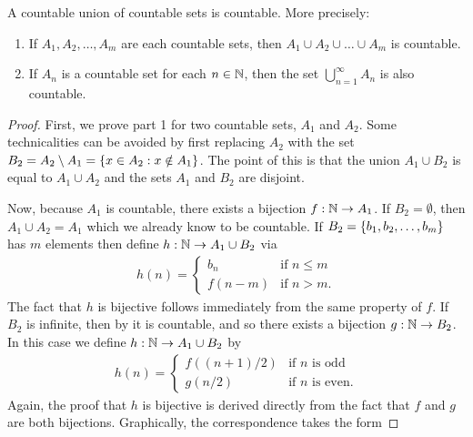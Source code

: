 \begin{theorem}
  A countable union of countable sets is countable. More precisely:
  \begin{enumerate}
    \item If $A_1, A_2, \dots, A_m$ are each countable sets, then
      $A_1 \cup A_2 \cup \dots \cup A_m$ is countable.
    \item If $A_n$ is a countable set for each $n \in \mathbb N$, then the
      set $\bigcup_{n = 1}^{\infty} A_n$ is also countable.
  \end{enumerate}
\end{theorem}

\begin{proof}
  First, we prove part 1 for two countable sets, $A_1$ and $A_2$.
  Some technicalities can be avoided by first replacing $A_2$ with
  the set $B_2 = A_2 \setminus A_1 = \{ x \in A_2 : x \notin A_1 \}$.
  The point of this is that the union $A_1 \cup B_2$ is equal to $A_1
  \cup A_2$ and the sets $A_1$ and $B_2$ are disjoint.

  Now, because $A_1$ is countable, there exists a bijection $f : \mathbb N
  \to A_1$. If $B_2 = \emptyset$, then $A_1 \cup A_2 = A_1$ which we
  already know to be countable. If $B_2 = \{ b_1, b_2, \dots, b_m \}$
  has $m$ elements then define $h : \mathbb N \to A_1 \cup B_2$ via
  \begin{align*}
    h(n) =
    \begin{cases}
      b_n & \text{if $n \leq m$} \\
      f(n - m) & \text{if $n > m$}.
    \end{cases}
  \end{align*}
  The fact that $h$ is bijective follows immediately from the same
  property of $f$. If $B_2$ is infinite, then by
   it is countable, and so there
  exists a bijection $g : \mathbb N \to B_2$. In this case we define $h :
  \mathbb N \to A_1 \cup B_2$ by
  \begin{align*}
    h(n) =
    \begin{cases}
      f((n + 1) / 2) & \text{if $n$ is odd} \\
      g(n / 2) & \text{if $n$ is even}.
    \end{cases}
  \end{align*}
  Again, the proof that $h$ is bijective is derived directly from the
  fact that $f$ and $g$ are both bijections. Graphically, the
  correspondence takes the form


\end{proof}
